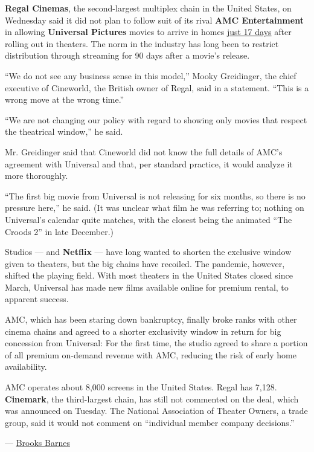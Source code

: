 \textbf{Regal Cinemas}, the second-largest multiplex chain in the United
States, on Wednesday said it did not plan to follow suit of its rival
\textbf{AMC Entertainment} in allowing \textbf{Universal Pictures}
movies to arrive in homes
\href{https://www.nytimes.com/2020/07/28/business/media/universal-amc-movies-at-home.html}{just
17 days} after rolling out in theaters. The norm in the industry has
long been to restrict distribution through streaming for 90 days after a
movie's release.

``We do not see any business sense in this model,'' Mooky Greidinger,
the chief executive of Cineworld, the British owner of Regal, said in a
statement. ``This is a wrong move at the wrong time.''

``We are not changing our policy with regard to showing only movies that
respect the theatrical window,'' he said.

Mr. Greidinger said that Cineworld did not know the full details of
AMC's agreement with Universal and that, per standard practice, it would
analyze it more thoroughly.

``The first big movie from Universal is not releasing for six months, so
there is no pressure here,'' he said. (It was unclear what film he was
referring to; nothing on Universal's calendar quite matches, with the
closest being the animated ``The Croods 2'' in late December.)

Studios --- and \textbf{Netflix} --- have long wanted to shorten the
exclusive window given to theaters, but the big chains have recoiled.
The pandemic, however, shifted the playing field. With most theaters in
the United States closed since March, Universal has made new films
available online for premium rental, to apparent success.

AMC, which has been staring down bankruptcy, finally broke ranks with
other cinema chains and agreed to a shorter exclusivity window in return
for big concession from Universal: For the first time, the studio agreed
to share a portion of all premium on-demand revenue with AMC, reducing
the risk of early home availability.

AMC operates about 8,000 screens in the United States. Regal has 7,128.
\textbf{Cinemark}, the third-largest chain, has still not commented on
the deal, which was announced on Tuesday. The National Association of
Theater Owners, a trade group, said it would not comment on ``individual
member company decisions.''

--- \href{https://www.nytimes.com/by/brooks-barnes}{Brooks Barnes}

